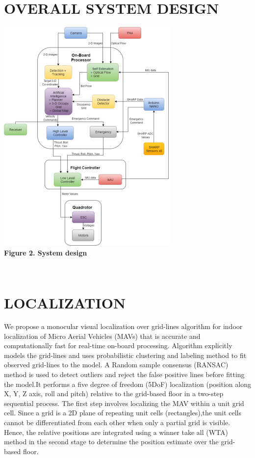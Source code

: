 \documentclass[12pt]{article}
\begin{document}
\section{OVERALL SYSTEM DESIGN}
\begin{center}\includegraphics[scale=0.5]{image22} \\
\textbf{Figure 2. System design}\end{center} \\

\section{LOCALIZATION}
We propose a monocular visual localization over grid-lines algorithm for indoor  localization  of  Micro  Aerial Vehicles  (MAVs)  that  is  accurate  and  computationally  fast for  real-time  on-board  processing. Algorithm  explicitly models  the  grid-lines  and  uses  probabilistic  clustering  and labeling  method  to  fit  observed  grid-lines  to  the  model.  A Random sample consensus (RANSAC) method is used to detect outliers and reject the false positive lines before fitting the model.It performs a five degree of freedom (5DoF) localization (position along X, Y, Z axis, roll and pitch) relative to  the  grid-based  floor  in  a  two-step  sequential  process.  The first step involves localizing the MAV within a unit grid cell. Since a grid is a 2D plane of repeating unit cells (rectangles),the  unit  cells  cannot  be  differentiated  from  each  other  when only a partial grid is visible. Hence, the relative positions are integrated using a winner take all (WTA) method in the second stage  to  determine  the  position  estimate  over  the  grid-based floor.
\end{document}
